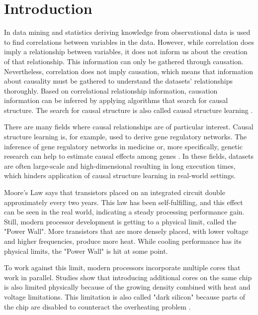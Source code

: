 \chapter{Introduction}
In data mining and statistics deriving knowledge from observational data is used to find correlations between variables in the data. However, while correlation does imply a relationship between variables, it does not inform us about the creation of that relationship. This information can only be gathered through causation. Nevertheless, correlation does not imply causation, which means that information about causality must be gathered to understand the datasets' relationships thoroughly. Based on correlational relationship information, causation information can be inferred by applying algorithms that search for causal structure. The search for causal structure is also called causal structure learning \cite{spirtesCausationPredictionSearch1993}.

There are many fields where causal relationships are of particular interest. Causal structure learning is, for example, used to derive gene regulatory networks. The inference of gene regulatory networks in medicine or, more specifically, genetic research can help to estimate causal effects among genes \cite{rauJointEstimationCausal2013}.
In these fields, datasets are often large-scale and high-dimensional resulting in long execution times, which hinders application of causal structure learning in real-world settings.

Moore's Law \cite{mooreCrammingMoreComponents1965} says that transistors placed on an integrated circuit double approximately every two years. This law has been self-fulfilling, and this effect can be seen in the real world, indicating a steady processing performance gain. Still, modern processor development is getting to a physical limit, called the "Power Wall". More transistors that are more densely placed, with lower voltage and higher frequencies, produce more heat. While cooling performance has its physical limits, the "Power Wall" is hit at some point.

To work against this limit, modern processors incorporate multiple cores that work in parallel. Studies show that introducing additional cores on the same chip is also limited physically because of the growing density combined with heat and voltage limitations. This limitation is also called "dark silicon" because parts of the chip are disabled to counteract the overheating problem \cite{esmaeilzadehDarkSiliconEnd2011}.


